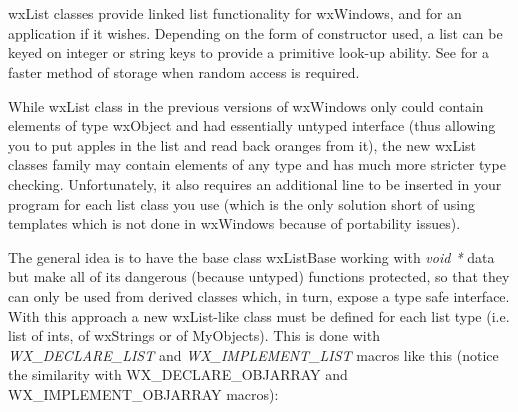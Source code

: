 \section{}\label{wxlist}

wxList classes provide linked list functionality for wxWindows, and for an
application if it wishes.  Depending on the form of constructor used, a list
can be keyed on integer or string keys to provide a primitive look-up ability.
See \rtfsp for a faster method of storage
when random access is required.

While wxList class in the previous versions of wxWindows only could contain
elements of type wxObject and had essentially untyped interface (thus allowing
you to put apples in the list and read back oranges from it), the new wxList
classes family may contain elements of any type and has much more stricter type
checking. Unfortunately, it also requires an additional line to be inserted in
your program for each list class you use (which is the only solution short of
using templates which is not done in wxWindows because of portability issues).

The general idea is to have the base class wxListBase working with {\it void *}
data but make all of its dangerous (because untyped) functions protected, so
that they can only be used from derived classes which, in turn, expose a type
safe interface. With this approach a new wxList-like class must be defined for
each list type (i.e. list of ints, of wxStrings or of MyObjects). This is done
with {\it WX\_DECLARE\_LIST} and {\it WX\_IMPLEMENT\_LIST} macros like this
(notice the similarity with WX\_DECLARE\_OBJARRAY and WX\_IMPLEMENT\_OBJARRAY
macros):


